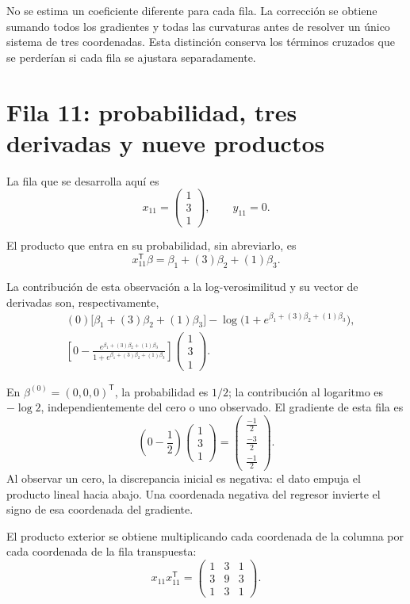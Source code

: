 \documentclass[11pt,a4paper]{article}
\newcommand{\T}{^{\mathsf T}}
\begin{document}
No se estima un coeficiente diferente para cada fila.
La corrección se obtiene sumando todos los gradientes y todas
las curvaturas antes de resolver un único sistema de tres coordenadas.
Esta distinción conserva los términos cruzados que se perderían
si cada fila se ajustara separadamente.

\clearpage
\section{Fila 11: probabilidad, tres derivadas y nueve productos}\label{logit93}
La fila que se desarrolla aquí es
\[
x_{11}=\begin{pmatrix}1\\3\\1\end{pmatrix},\qquad y_{11}=0.
\]

El producto que entra en su probabilidad, sin abreviarlo, es
\[
x_{11}\T\beta=\beta_1+(3)\beta_2+(1)\beta_3.
\]

La contribución de esta observación a la log-verosimilitud
y su vector de derivadas son, respectivamente,
\[
\begin{aligned}
&(0)\bigl[\beta_1+(3)\beta_2+(1)\beta_3\bigr]-\log\bigl(1+e^{\beta_1+(3)\beta_2+(1)\beta_3}\bigr),\\&\left[0-\frac{e^{\beta_1+(3)\beta_2+(1)\beta_3}}{1+e^{\beta_1+(3)\beta_2+(1)\beta_3}}\right]\begin{pmatrix}1\\3\\1\end{pmatrix}.\end{aligned}
\]

En \(\beta^{(0)}=(0,0,0)\T\), la probabilidad es \(1/2\);
la contribución al logaritmo es \(-\log2\), independientemente
del cero o uno observado. El gradiente de esta fila es
\[
\left(0-\frac12\right)\begin{pmatrix}1\\3\\1\end{pmatrix}=\begin{pmatrix}\frac{-1}{2}\\\frac{-3}{2}\\\frac{-1}{2}\end{pmatrix}.
\]
Al observar un cero, la discrepancia inicial es negativa: el dato empuja el producto lineal hacia abajo. Una coordenada negativa del regresor invierte el signo de esa coordenada del gradiente.

El producto exterior se obtiene multiplicando cada coordenada
de la columna por cada coordenada de la fila transpuesta:
\[
x_{11}x_{11}\T=\begin{pmatrix}1&3&1\\3&9&3\\1&3&1\end{pmatrix}.
\]
\end{document}
